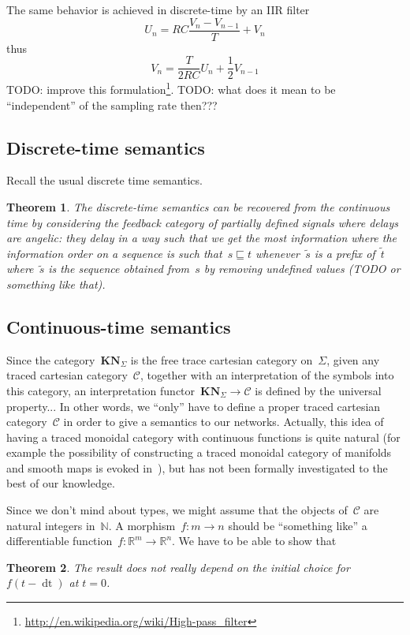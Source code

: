 \documentclass{article}
\newtheorem{theorem}{Theorem}
\newcommand{\dd}[1]{\mathop{\mathrm{d}#1}}
\newcommand{\N}{\mathbb{N}}
\newcommand{\R}{\mathbb{R}}
\newcommand{\category}[1]{\mathbf{#1}}
\newcommand{\KN}{\category{KN}}
\renewcommand{\C}{\mathcal{C}}
\begin{document}
The same behavior is achieved in discrete-time by an IIR filter
\[
U_n=RC\frac{V_n-V_{n-1}}{T}+V_n
\]
thus
\[
V_n=\frac{T}{2RC}U_n+\frac 12 V_{n-1}
\]
TODO: improve this
formulation\footnote{\url{http://en.wikipedia.org/wiki/High-pass_filter}}. TODO:
what does it mean to be ``independent'' of the sampling rate then???

\subsection{Discrete-time semantics}
Recall the usual discrete time semantics.

\begin{theorem}
  The discrete-time semantics can be recovered from the continuous time by
  considering the feedback category of partially defined signals where delays
  are angelic: they delay in a way such that we get the most information where
  the information order on a sequence is such that~$s\sqsubseteq t$
  whenever~$\tilde{s}$ is a prefix of~$\tilde{t}$ where~$\tilde{s}$ is the
  sequence obtained from~$s$ by removing undefined values (TODO or something
  like that).
\end{theorem}

\subsection{Continuous-time semantics}
Since the category~$\KN_\Sigma$ is the free trace cartesian category
on~$\Sigma$, given any traced cartesian category~$\C$, together with an
interpretation of the symbols into this category, an interpretation
functor~$\KN_\Sigma\to\C$ is defined by the universal property... In other
words, we ``only'' have to define a proper traced cartesian category~$\C$ in
order to give a semantics to our networks. Actually, this idea of having a
traced monoidal category with continuous functions is quite natural (for example
the possibility of constructing a traced monoidal category of manifolds and
smooth maps is evoked in~\cite{abramsky1996retracing}), but has not been
formally investigated to the best of our knowledge.

Since we don't mind about types, we might assume that the objects of~$\C$ are
natural integers in~$\N$. A morphism~$f:m\to n$ should be ``something like'' a
differentiable function~$f:\R^m\to\R^n$. We have to be able to show that

\begin{theorem}
  The result does not really depend on the initial choice for $f(t-\dd t)$ at
  $t=0$.
\end{theorem}
\end{document}
